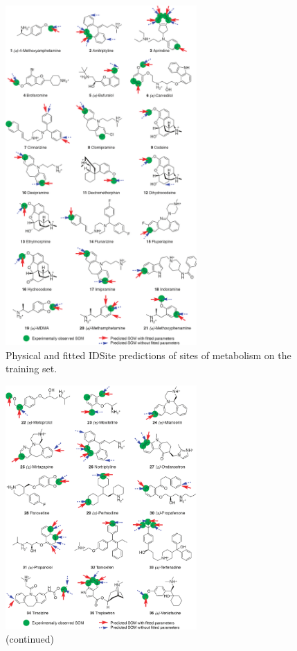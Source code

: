 \begin{figure}
\centering
\includegraphics[width=0.65\textwidth]{figures/idsite/idsite_figure-007.png}
\caption{Physical and fitted IDSite predictions of sites of metabolism on the training set.}
\label{fig:idsite_traininga}
\end{figure}

\begin{figure}
\ContinuedFloat
\centering
\includegraphics[width=0.65\textwidth]{figures/idsite/idsite_figure-008.png}
\caption{(continued)}
\label{fig:idsite_trainingb}
\end{figure}

